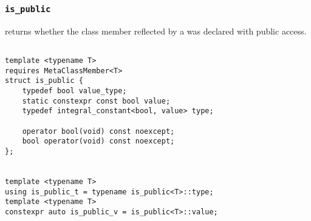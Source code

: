 
\subsubsection{\texttt{is\_public}}

returns whether the class member reflected by a  was declared with public access.

\begin{verbatim}

template <typename T>
requires MetaClassMember<T>
struct is_public {
	typedef bool value_type;
	static constexpr const bool value;
	typedef integral_constant<bool, value> type;

	operator bool(void) const noexcept;
	bool operator(void) const noexcept;
};


template <typename T>
using is_public_t = typename is_public<T>::type;
template <typename T>
constexpr auto is_public_v = is_public<T>::value;

\end{verbatim}
